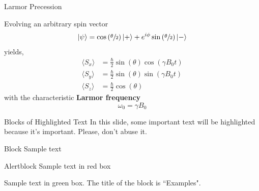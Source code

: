 \documentclass[aspectratio=169,xcolor=dvipsnames]{beamer}
\newcommand{\pauliz}{\begin{pmatrix}
    1 & 0 \\
    0 & -1 
    \end{pmatrix}}
\DeclarePairedDelimiter\ket{\lvert}{\rangle}
\begin{document}
\begin{frame}{Larmor Precession}

    \begin{minipage}{0.6\linewidth}
        Evolving an arbitrary spin vector
        \begin{gather*}
            \ket{\psi} = \cos\left(\sfrac{\theta}{2}\right)\ket{+}+ e^{i\phi}\sin\left(\sfrac{\theta}{2}\right) \ket{-}
        \end{gather*}
        yields, 
        \begin{align*}
            \langle S_x \rangle &= \frac{\hbar}{2} \sin(\theta)\cos(\gamma B_0 t)\\
            \langle S_y \rangle &= \frac{\hbar}{2} \sin(\theta)\sin(\gamma B_0 t)\\
            \langle S_z \rangle &= \frac{\hbar}{2} \cos(\theta)   
        \end{align*}
        with the characteristic \textbf{Larmor frequency}
        \begin{equation}
            \omega_0 = \gamma B_0 
        \end{equation}
    \end{minipage}
    \begin{minipage}{0.3\linewidth}

        
    \end{minipage}
    
\end{frame}



\begin{frame}{Blocks of Highlighted Text}
    In this slide, some important text will be \alert{highlighted} because it's important. Please, don't abuse it.

    \begin{block}{Block}
        Sample text
    \end{block}

    \begin{alertblock}{Alertblock}
        Sample text in red box
    \end{alertblock}

    \begin{examples}
        Sample text in green box. The title of the block is ``Examples".
    \end{examples}
\end{frame}
\end{document}
